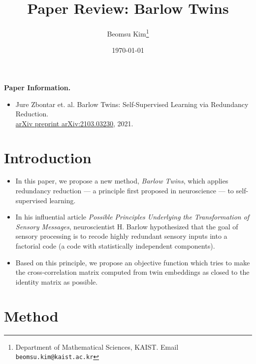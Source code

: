 \documentclass[10pt]{article}
\title{Paper Review: Barlow Twins}
\author{Beomsu Kim\footnote{Department of Mathematical Sciences, KAIST. Email \texttt{beomsu.kim@kaist.ac.kr}}}
\date{\today}
\begin{document}
\maketitle

\textbf{Paper Information.}

\begin{itemize}
\item Jure Zbontar et. al. Barlow Twins: Self-Supervised Learning via Redundancy Reduction. \\ \underline{arXiv preprint arXiv:2103.03230}, 2021.
\end{itemize}

\section{Introduction}

\begin{itemize}
\item In this paper, we propose a new method, \textit{Barlow Twins}, which applies redundancy reduction --- a principle first proposed in neuroscience --- to self-supervised learning.
\item In his influential article \textit{Possible Principles Underlying the Transformation of Sensory Messages}, neuroscientist H. Barlow hypothesized that the goal of sensory processing is to recode highly redundant sensory inputs into a factorial code (a code with statistically independent components).
\item Based on this principle, we propose an objective function which tries to make the cross-correlation matrix computed from twin embeddings as closed to the identity matrix as possible.
\end{itemize}

\section{Method}
\end{document}
